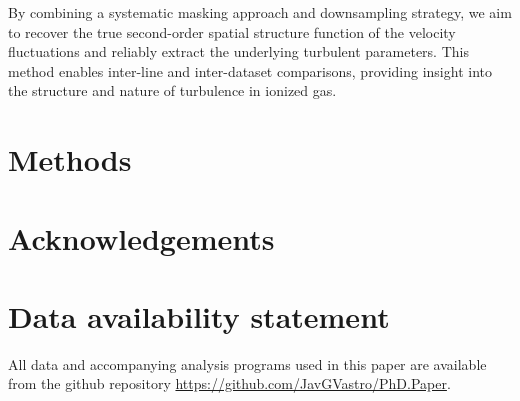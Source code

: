 \documentclass[fleqn,usenatbib, useAMS, a4paper]{mnras}
\begin{document}
By combining a systematic masking approach and downsampling strategy, we aim to recover the true second-order spatial structure function of the velocity fluctuations and reliably extract the underlying turbulent parameters. 
This method enables inter-line and inter-dataset comparisons, providing insight into the structure and nature of turbulence in ionized gas.

\section{Methods}


\section*{Acknowledgements}

\section*{Data availability statement}
\label{sec:data-avail-stat}
All data and accompanying analysis programs used in this paper are available
from the github repository \url{https://github.com/JavGVastro/PhD.Paper}.






%
\bsp	%
\label{lastpage}
\end{document}
